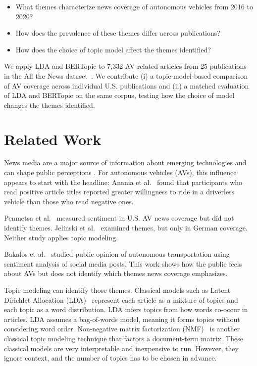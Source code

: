\documentclass[conference]{IEEEtran}
\begin{document}
\begin{itemize}
    \item What themes characterize news coverage of autonomous vehicles from 2016 to 2020?
    \item How does the prevalence of these themes differ across publications?
    \item How does the choice of topic model affect the themes identified?
\end{itemize}

We apply LDA and BERTopic to 7,332 AV-related articles from 25 publications in the All the News dataset~\cite{mckinley2021}. We contribute (i) a topic-model-based comparison of AV coverage across individual U.S. publications and (ii) a matched evaluation of LDA and BERTopic on the same corpus, testing how the choice of model changes the themes identified.


\section*{Related Work}
News media are a major source of information about emerging technologies and can shape public perceptions \cite{christen2007media}. For autonomous vehicles (AVs), this influence appears to start with the headline: Anania et al.~\cite{anania2018effects} found that participants who read positive article titles reported greater willingness to ride in a driverless vehicle than those who read negative ones.

Penmetsa et al.~\cite{penmetsa2023news} measured sentiment in U.S. AV news coverage but did not identify themes. Jelinski et al.~\cite{jelinski2021undifferentiated} examined themes, but only in German coverage. Neither study applies topic modeling.

Bakalos et al.~\cite{bakalos2020} studied public opinion of autonomous transportation using sentiment analysis of social media posts. This work shows how the public feels about AVs but does not identify which themes news coverage emphasizes.

Topic modeling can identify those themes. Classical models such as Latent Dirichlet Allocation (LDA)~\cite{blei2003lda} represent each article as a mixture of topics and each topic as a word distribution. LDA infers topics from how words co-occur in articles. LDA assumes a bag-of-words model, meaning it forms topics without considering word order. Non-negative matrix factorization (NMF)~\cite{lee1999nmf} is another classical topic modeling technique that factors a document-term matrix. These classical models are very interpretable and inexpensive to run. However, they ignore context, and the number of topics has to be chosen in advance. 
\end{document}
